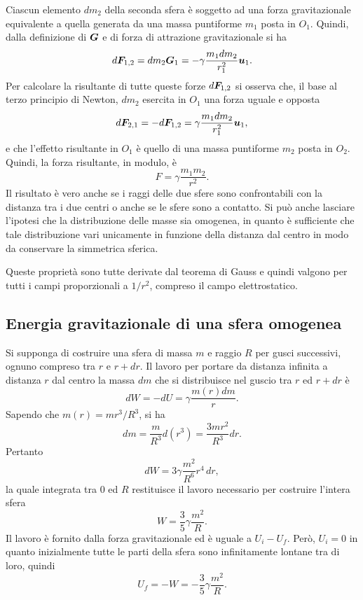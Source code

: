 Ciascun elemento $dm_2$ della seconda sfera è soggetto ad una forza gravitazionale equivalente a quella generata da una massa puntiforme $m_1$ posta in $O_1$. Quindi, dalla definizione di $\bm{G}$ e di forza di attrazione gravitazionale si ha
\begin{equation}
    d\bm{F}_{1,2}=dm_2\bm{G}_1=-\gamma\frac{m_1 dm_2}{r_1^2}\bm{u}_1.
\end{equation}
Per calcolare la risultante di tutte queste forze $d\bm{F}_{1,2}$ si osserva che, il base al terzo principio di Newton, $dm_2$ esercita in $O_1$ una forza uguale e opposta
\begin{equation}
    d\bm{F}_{2,1}=-d\bm{F}_{1,2}=\gamma\frac{m_1 dm_2}{r_1^2}\bm{u}_1,
\end{equation}
e che l'effetto risultante in $O_1$ è quello di una massa puntiforme $m_2$ posta in $O_2$. Quindi, la forza risultante, in modulo, è
\begin{equation}
    F=\gamma\frac{m_1m_2}{r^2}.
\end{equation}
Il risultato è vero anche se i raggi delle due sfere sono confrontabili con la distanza tra i due centri o anche se le sfere sono a contatto. Si può anche lasciare l'ipotesi che la distribuzione delle masse sia omogenea, in quanto è sufficiente che tale distribuzione vari unicamente in funzione della distanza dal centro in modo da conservare la simmetrica sferica.
\begin{obs}
    Queste proprietà sono tutte derivate dal teorema di Gauss e quindi valgono per tutti i campi proporzionali a $1/r^2$, compreso il campo elettrostatico. 
\end{obs}

\subsection{Energia gravitazionale di una sfera omogenea}
Si supponga di costruire una sfera di massa $m$ e raggio $R$ per gusci successivi, ognuno compreso tra $r$ e $r+dr$. Il lavoro per portare da distanza infinita a distanza $r$ dal centro la massa $dm$ che si distribuisce nel guscio tra $r$ ed $r+dr$ è
\begin{equation}
    dW=-dU=\gamma\frac{m(r)dm}{r}.
\end{equation}
Sapendo che $m(r)=mr^3/R^3$, si ha
\begin{equation}
    dm=\frac{m}{R^3}d(r^3)=\frac{3mr^2}{R^3}dr.
\end{equation}
Pertanto
\begin{equation}
    dW=3\gamma\frac{m^2}{R^6}r^4\,dr,
\end{equation}
la quale integrata tra $0$ ed $R$ restituisce il lavoro necessario per costruire l'intera sfera
\begin{equation}
    W=\frac{3}{5}\gamma\frac{m^2}{R}.
\end{equation}
Il lavoro è fornito dalla forza gravitazionale ed è uguale a $U_i-U_f$. Però, $U_i=0$ in quanto inizialmente tutte le parti della sfera sono infinitamente lontane tra di loro, quindi
\begin{equation}
    U_f=-W=-\frac{3}{5}\gamma\frac{m^2}{R}.
\end{equation}

